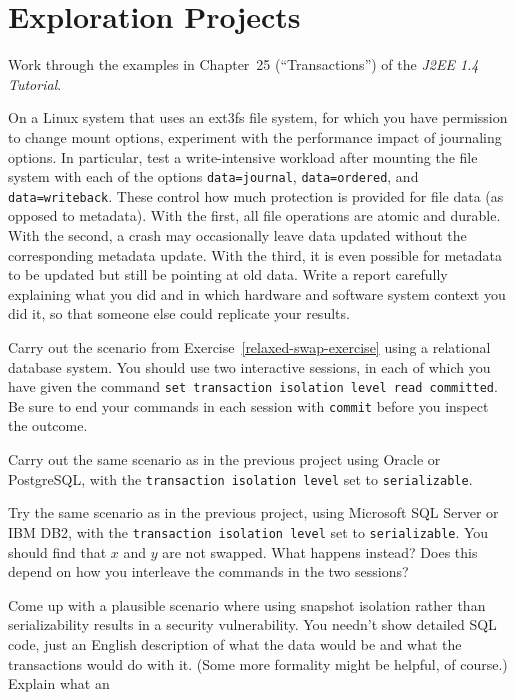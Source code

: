 \section*{Exploration Projects}
\begin{chapterEnumerate}
\item
Work through the examples in Chapter~25 (``Transactions'') of the
\textit{J2EE 1.4 Tutorial}.
\item
On a Linux system that uses an ext3fs file system, for which you have
permission to change mount options, experiment with the performance
impact of journaling options.  In particular, test a write-intensive
workload after mounting the file system with each of the options
\verb|data=journal|, \verb|data=ordered|, and
\verb|data=writeback|.  These control how much protection is
provided for file data (as opposed to metadata).  With the first, all
file operations are atomic and durable.  With the second, a crash may
occasionally leave data updated without the corresponding metadata
update.  With the third, it is even possible for metadata to be
updated but still be pointing at old data.  
Write a report 
carefully explaining what you did and in which hardware and software
system context you did it, so that someone else could replicate
your results.
\item
Carry out the scenario from Exercise~\ref{relaxed-swap-exercise} using a relational
database system.  You should use two interactive sessions, in each of
which you have given the command {\tt set transaction isolation level
read committed}.  Be sure to end your commands in each session with
{\tt commit} before  you inspect the outcome.
\item
Carry out the same scenario as in the previous project using Oracle
or PostgreSQL, with the {\tt transaction isolation level} set to
{\tt serializable}.
\item
Try the same scenario as in the previous project, using Microsoft SQL
Server or IBM DB2, with the {\tt transaction isolation level} set to
{\tt serializable}.  You should find that $x$ and $y$ are not swapped.  What
happens instead?  Does this depend on how you interleave the commands
in the two sessions?
\item
Come up with a plausible scenario where using snapshot isolation
rather than serializability results in a security vulnerability.  You
needn't show detailed SQL code, just an English description of what
the data would be and what the transactions would do with it.  (Some
more formality might be helpful, of course.)  Explain what an

\end{chapterEnumerate}
